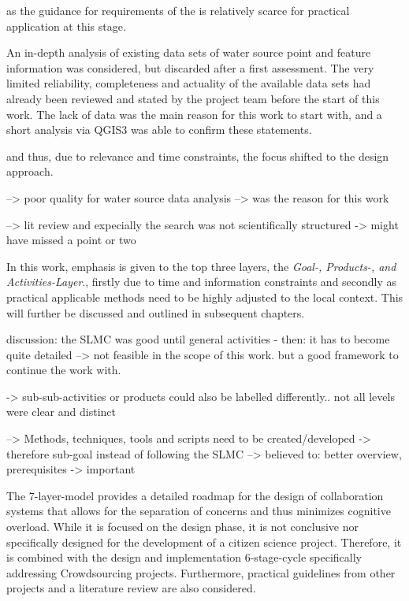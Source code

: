 as the guidance for requirements of the is relatively scarce for practical application at this stage. 


An in-depth analysis of existing data sets of water source point and feature information was considered, but  discarded after a first assessment. The very limited reliability, completeness and actuality of the available data sets had already been reviewed and stated by the project team before the start of this work. The lack of data was the main reason for this work to start with, and a short analysis via QGIS3 was able to confirm these statements. 


and thus, due to relevance and time constraints, the focus shifted to the design approach.


--> poor quality for water source data analysis --> was the reason for this work


--> lit review and expecially the search was not scientifically structured -> might have missed a point or two

In this work, emphasis is given to the top three layers, the \textit{Goal-, Products-, and Activities-Layer}., firstly due to time and information constraints and secondly as practical applicable methods need to be highly adjusted to the local context. This will further be discussed and outlined in subsequent chapters.

discussion: the SLMC was good until general activities - then: it has to become quite detailed --> not feasible in the scope of this work. but a good framework to continue the work with.


-> sub-sub-activities or products could also be labelled differently.. not all levels were clear and distinct

--> Methods, techniques, tools and scripts need to be created/developed -> therefore sub-goal instead of following the SLMC --> believed to: better overview, prerequisites -> important


The 7-layer-model provides a detailed roadmap for the design of collaboration systems that allows for the separation of concerns and thus minimizes cognitive overload. While it is focused on the design phase, it is not conclusive nor specifically designed for the development of a citizen science project. Therefore, it is combined with the design and implementation 6-stage-cycle specifically addressing Crowdsourcing projects. Furthermore, practical guidelines from other projects and a literature review are also considered.

